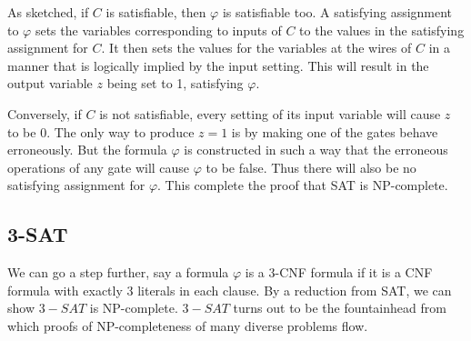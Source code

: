As sketched, if $C$ is satisfiable, then $\varphi$ is satisfiable too. A satisfying assignment to $\varphi$ sets the variables corresponding to inputs of $C$ to the values in the satisfying assignment for $C$. It then sets the values for the variables at the wires of $C$ in a manner that is logically implied by the input setting. This will result in the output variable $z$ being set to 1, satisfying $\varphi$.

Conversely, if $C$ is not satisfiable, every setting of its input variable will cause $z$ to be 0. The only way to produce $z = 1$ is by making one of the gates behave erroneously. But the formula $\varphi$ is constructed in such a way that the erroneous operations of any gate will cause $\varphi$ to be false. Thus there will also be no satisfying assignment for $\varphi$. This complete the proof that SAT is NP-complete.

\subsection{3-SAT}
We can go a step further, say a formula $\varphi$ is a 3-CNF formula if it is a CNF formula with exactly 3 literals in each clause. By a reduction from SAT, we can show $3-SAT$ is NP-complete. $3-SAT$ turns out to be the fountainhead from which proofs of NP-completeness of many diverse problems flow.


















